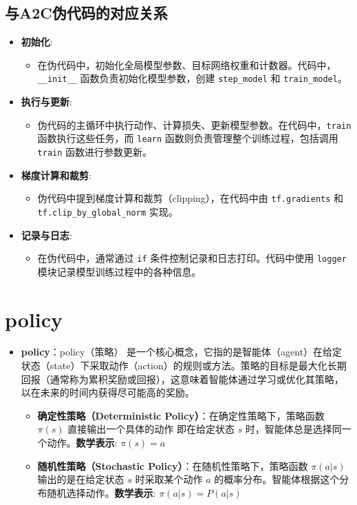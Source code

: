 \documentclass[twocolumn, 10pt]{article} %
\theoremstyle{remark}
\begin{document}
\subsection{与A2C伪代码的对应关系}
\begin{itemize}
    \item \textbf{初始化}:
    \begin{itemize}
        \item 在伪代码中，初始化全局模型参数、目标网络权重和计数器。代码中，\texttt{\_\_init\_\_} 函数负责初始化模型参数，创建 \texttt{step\_model} 和 \texttt{train\_model}。
    \end{itemize}
    \item \textbf{执行与更新}:
    \begin{itemize}
        \item 伪代码的主循环中执行动作、计算损失、更新模型参数。在代码中，\texttt{train} 函数执行这些任务，而 \texttt{learn} 函数则负责管理整个训练过程，包括调用 \texttt{train} 函数进行参数更新。
    \end{itemize}
    \item \textbf{梯度计算和裁剪}:
    \begin{itemize}
        \item 伪代码中提到梯度计算和裁剪（clipping），在代码中由 \texttt{tf.gradients} 和 \texttt{tf.clip\_by\_global\_norm} 实现。
    \end{itemize}
    \item \textbf{记录与日志}:
    \begin{itemize}
        \item 在伪代码中，通常通过 \texttt{if} 条件控制记录和日志打印。代码中使用 \texttt{logger} 模块记录模型训练过程中的各种信息。
    \end{itemize}
\end{itemize}


\section{policy}
\begin{itemize}
    \item \textbf{policy}：policy（策略） 是一个核心概念，它指的是智能体（agent）在给定状态（state）下采取动作（action）的规则或方法。策略的目标是最大化长期回报（通常称为累积奖励或回报），这意味着智能体通过学习或优化其策略，以在未来的时间内获得尽可能高的奖励。
\begin{itemize}
    \item \textbf{	确定性策略（Deterministic Policy）}：在确定性策略下，策略函数  $\pi \left( s \right)$ 直接输出一个具体的动作  即在给定状态  $s$ 时，智能体总是选择同一个动作。\textbf{数学表示}:  $\pi \left(s\right) = a$
\end{itemize}
\begin{itemize}
    \item \textbf{	随机性策略（Stochastic Policy）}：在随机性策略下，策略函数  $\pi \left( a|s \right)$   输出的是在给定状态  $s$ 时采取某个动作 $a$ 的概率分布。智能体根据这个分布随机选择动作。\textbf{数学表示}:  $\pi\left(a|s\right)=P\left(a|s\right)$
\end{itemize}
\end{itemize}
\end{document}
